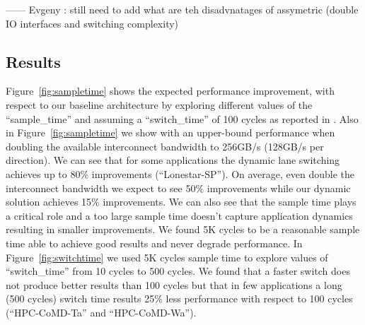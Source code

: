 ------  Evgeny : still need to add what are teh disadvnatages of assymetric
(double IO interfaces and switching complexity)



 \subsection{Results}
Figure~\ref{fig:sampletime} shows the expected performance improvement, with 
respect to our baseline architecture by exploring different values 
of the ``sample\_time'' and assuming a ``switch\_time'' of 100 cycles 
as reported in \cite{REALLY_NEED_REF_HERE}. Also in Figure~\ref{fig:sampletime}
we show with an upper-bound performance when doubling
the available interconnect bandwidth to 256GB/s (128GB/s per direction). 
We can see that for some applications the dynamic lane switching achieves up to
80\% improvements (``Lonestar-SP''). On average, even double the interconnect 
bandwidth we expect to see 50\% improvements while our dynamic solution 
achieves 15\% improvements. We can also see that the sample time plays a 
critical role and a too large sample time doesn't capture application dynamics 
resulting in smaller improvements. We found 5K cycles to be a reasonable sample
time able to achieve good results and never degrade performance. 
In Figure~\ref{fig:switchtime} we used 5K cycles sample time to
explore values of ``switch\_time'' from 10 cycles to 500 cycles.
We found that a faster switch does not produce better results than 100 cycles
but that in few applications a long (500 cycles) switch time results 25\% 
less performance with respect to 100 cycles (``HPC-CoMD-Ta'' and 
``HPC-CoMD-Wa'').





